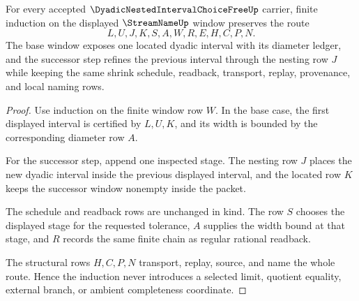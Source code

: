 \begin{theorem}\label{thm:dyadic-nested-interval-choice-free-window-induction}
For every accepted $\DyadicNestedIntervalChoiceFreeUp$ carrier, finite induction on the displayed $\StreamNameUp$ window preserves the route
$$
L,U,J,K,S,A,W,R,E,H,C,P,N .
$$
The base window exposes one located dyadic interval with its diameter ledger, and the successor step refines the previous interval through the nesting row $J$ while keeping the same shrink schedule, readback, transport, replay, provenance, and local naming rows.
\end{theorem}
\begin{proof}
Use induction on the finite window row $W$. In the base case, the first displayed interval is certified by $L,U,K$, and its width is bounded by the corresponding diameter row $A$.

For the successor step, append one inspected stage. The nesting row $J$ places the new dyadic interval inside the previous displayed interval, and the located row $K$ keeps the successor window nonempty inside the packet.

The schedule and readback rows are unchanged in kind. The row $S$ chooses the displayed stage for the requested tolerance, $A$ supplies the width bound at that stage, and $R$ records the same finite chain as regular rational readback.

The structural rows $H,C,P,N$ transport, replay, source, and name the whole route. Hence the induction never introduces a selected limit, quotient equality, external branch, or ambient completeness coordinate.
\end{proof}

